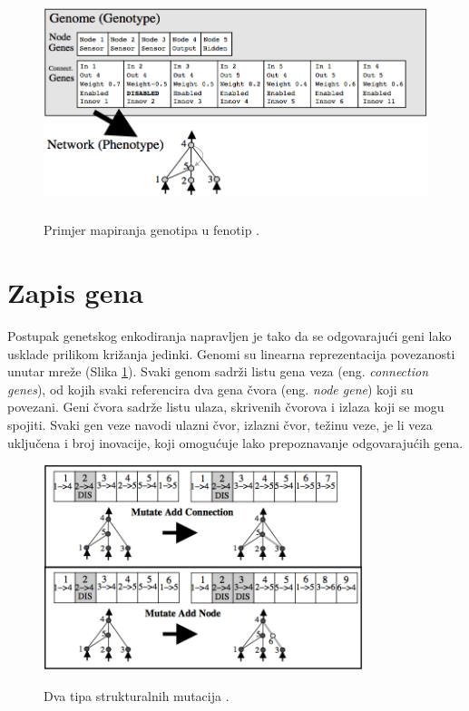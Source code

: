 \documentclass[times, utf8, seminar, numeric]{fer}
\begin{document}
\begin{figure}[ht]
  \centering
  \includegraphics[height=6cm]{slika1}\\
  \caption{Primjer mapiranja genotipa u fenotip \citep{rad2}.}
  \label{slika1}
\end{figure}

\section{Zapis gena}
Postupak genetskog enkodiranja napravljen je tako da se odgovarajući geni lako usklade prilikom križanja jedinki. Genomi su linearna reprezentacija povezanosti unutar mreže (Slika \ref{slika1}). Svaki genom sadrži listu gena veza (eng. \textit{connection genes}), od kojih svaki referencira dva gena čvora (eng. \textit{node gene}) koji su povezani. Geni čvora sadrže listu ulaza, skrivenih čvorova i izlaza koji se mogu spojiti. Svaki gen veze navodi ulazni čvor, izlazni čvor, težinu veze, je li veza uključena i broj inovacije, koji omogućuje lako prepoznavanje odgovarajućih gena.

\begin{figure}[ht]
  \centering
  \includegraphics[height=6cm]{slika2}\\
  \caption{Dva tipa strukturalnih mutacija \citep{rad2}.}
  \label{slika2}
\end{figure}
\end{document}
